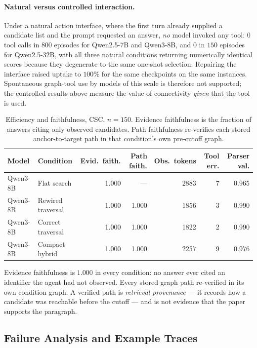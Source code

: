 \paragraph{Natural versus controlled interaction.} Under a natural action interface, where the first
turn already supplied a candidate list and the prompt requested an answer, \emph{no} model invoked
any tool: $0$ tool calls in $800$ episodes for Qwen2.5-7B and Qwen3-8B, and $0$ in $150$ episodes
for Qwen2.5-32B, with all three natural conditions returning numerically identical scores because
they degenerate to the same one-shot selection. Repairing the interface raised uptake to $100\%$ for
the same checkpoints on the same instances. Spontaneous graph-tool use by models of this scale is
therefore not supported; the controlled results above measure the value of connectivity \emph{given}
that the tool is used.

\begin{table}[t]
\centering
\small
\caption{Efficiency and faithfulness, CSC, $n{=}150$. Evidence faithfulness is the fraction of
answers citing only observed candidates. Path faithfulness re-verifies each stored
anchor-to-target path in that condition's own pre-cutoff graph.}
\label{tab:ar-faith}
\begin{tabular}{llrrrrr}
\toprule
Model & Condition & Evid.\ faith. & Path faith. & Obs.\ tokens & Tool err. & Parser val. \\
\midrule
Qwen3-8B & Flat search & 1.000 & --- & 2883 & 7 & 0.965 \\
Qwen3-8B & Rewired traversal & 1.000 & 1.000 & 1856 & 3 & 0.990 \\
Qwen3-8B & Correct traversal & 1.000 & 1.000 & 1822 & 2 & 0.990 \\
Qwen3-8B & Compact hybrid & 1.000 & 1.000 & 2257 & 9 & 0.976 \\
\bottomrule
\end{tabular}
\end{table}

Evidence faithfulness is $1.000$ in every condition: no answer ever cited an identifier the agent
had not observed. Every stored graph path re-verified in its own condition graph. A verified path is
\emph{retrieval provenance} — it records how a candidate was reachable before the cutoff — and is
not evidence that the paper supports the paragraph.

\subsection{Failure Analysis and Example Traces}
\label{appendix:ar-failures}

